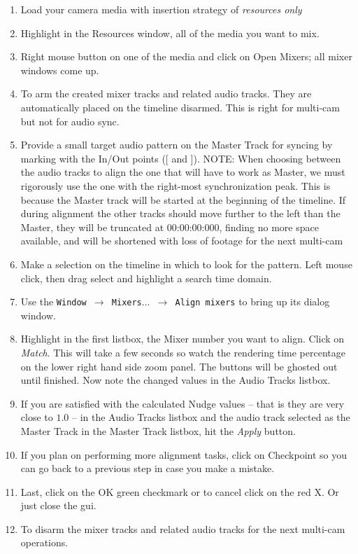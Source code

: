 \begin{enumerate}
	\item Load your camera media with insertion strategy of \textit{resources only}
	\item Highlight in the Resources window, all of the media you want to mix.
	\item Right mouse button on one of the media and click on Open Mixers; all mixer windows come up.
	\item To arm the created mixer tracks and related audio tracks. They are automatically placed on the timeline disarmed. This is right for multi-cam but not for audio sync.
	\item Provide a small target audio pattern on the Master Track for syncing by marking with the In/Out points ([ and ]). NOTE: When choosing between the audio tracks to align the one that will have to work as Master, we must rigorously use the one with the right-most synchronization peak. This is because the Master track will be started at the beginning of the timeline. If during alignment the other tracks should move further to the left than the Master, they will be truncated at 00:00:00:000, finding no more space available, and will be shortened with loss of footage for the next multi-cam
	\item Make a selection on the timeline in which to look for the pattern. Left mouse click, then drag select and highlight a search time domain. 
	\item Use the \texttt{Window $\rightarrow$ Mixers$\dots$ $\rightarrow$  Align mixers} to bring up its dialog window.
	\item Highlight in the first listbox, the Mixer number you want to align. Click on \textit{Match}. This will take a few seconds so watch the rendering time percentage on the lower right hand side zoom panel. The buttons will be ghosted out until finished. Now note the changed values in the Audio Tracks listbox.
	\item If you are satisfied with the calculated Nudge values -- that is they are very close to $1.0$ -- in the Audio Tracks listbox and the audio track selected as the Master Track in the Master Track listbox, hit the \textit{Apply} button.
	\item If you plan on performing more alignment tasks, click on Checkpoint so you can go back to a previous step in case you make a mistake.
	\item Last, click on the OK green checkmark or to cancel click on the red X.  Or just close the gui.
	\item To disarm the mixer tracks and related audio tracks for the next multi-cam operations.
\end{enumerate}

